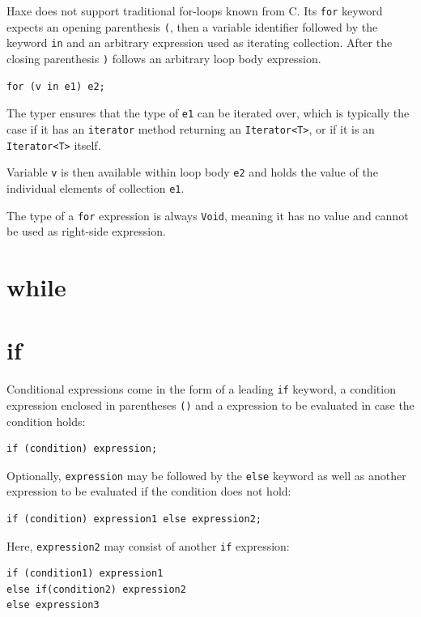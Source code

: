 \documentclass[a4paper,oneside]{book}
\newcommand{\type}[1]{\texttt{#1}}
\newcommand{\expr}[1]{\texttt{#1}}
\begin{document}
Haxe does not support traditional for-loops known from C. Its \expr{for} keyword expects an opening parenthesis \expr{(}, then a variable identifier followed by the keyword \expr{in} and an arbitrary expression used as iterating collection. After the closing parenthesis \expr{)} follows an arbitrary loop body expression.

\begin{lstlisting}
for (v in e1) e2;
\end{lstlisting}

The typer ensures that the type of \expr{e1} can be iterated over, which is typically the case if it has an \expr{iterator} method returning an \type{Iterator<T>}, or if it is an \type{Iterator<T>} itself.

Variable \expr{v} is then available within loop body \expr{e2} and holds the value of the individual elements of collection \expr{e1}.

The type of a \expr{for} expression is always \type{Void}, meaning it has no value and cannot be used as right-side expression.

\section{while}
\label{expression-while}

\section{if}
\label{expression-if}

Conditional expressions come in the form of a leading \expr{if} keyword, a condition expression enclosed in parentheses \expr{()} and a expression to be evaluated in case the condition holds:

\begin{lstlisting}
if (condition) expression;
\end{lstlisting}

Optionally, \expr{expression} may be followed by the \expr{else} keyword as well as another expression to be evaluated if the condition does not hold:

\begin{lstlisting}
if (condition) expression1 else expression2;
\end{lstlisting}

Here, \expr{expression2} may consist of another \expr{if} expression:

\begin{lstlisting}
if (condition1) expression1
else if(condition2) expression2
else expression3
\end{lstlisting}
\end{document}
